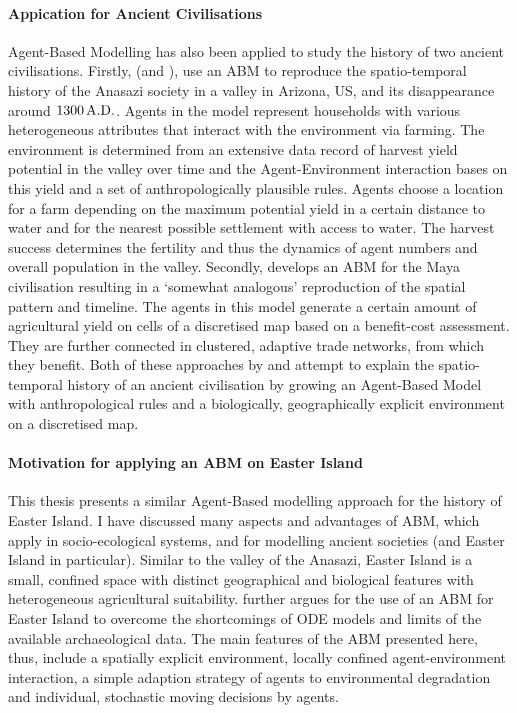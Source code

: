 \paragraph{Appication for Ancient Civilisations}
Agent-Based Modelling has also been applied to study the history of two ancient civilisations.
Firstly, \citet{Axtell2002} (and \citet{Janssen2009}), use an ABM to reproduce the spatio-temporal history of the Anasazi society in a valley in Arizona, US, and its disappearance around $1300\, {\rm A.D.}$. 
Agents in the model represent households with various heterogeneous attributes that interact with the environment via farming. 
The environment is determined from an extensive data record of harvest yield potential in the valley over time and the Agent-Environment interaction bases on this yield and a set of anthropologically plausible rules.
Agents choose a location for a farm depending on the maximum potential yield in a certain distance to water and for the nearest possible settlement with access to water. The harvest success determines the fertility and thus the dynamics of agent numbers and overall population in the valley.
Secondly, \citet{Heckbert2013} develops an ABM for the Maya civilisation resulting in a `somewhat analogous' reproduction of the spatial pattern and timeline.
The agents in this model generate a certain amount of agricultural yield on cells of a discretised map based on a benefit-cost assessment. 
They are further connected in clustered, adaptive trade networks, from which they benefit.
Both of these approaches by \citet{Axtell2002} and \citet{Heckbert2013} attempt to explain the spatio-temporal history of an ancient civilisation by growing an Agent-Based Model with anthropological rules and a biologically, geographically explicit environment on a discretised map.


\paragraph{Motivation for applying an ABM on Easter Island}
This thesis presents a similar Agent-Based modelling approach for the history of Easter Island.
I have discussed many aspects and advantages of ABM, which apply in socio-ecological systems, and for modelling ancient societies (and Easter Island in particular).
Similar to the valley of the Anasazi, Easter Island is a small, confined space with distinct geographical and biological features with heterogeneous agricultural suitability.
\citet{Merico2017} further argues for the use of an ABM for Easter Island to overcome the shortcomings of ODE models and limits of the available archaeological data.
The main features of the ABM presented here, thus, include a spatially explicit environment, locally confined agent-environment interaction, a simple adaption strategy of agents to environmental degradation and individual, stochastic moving decisions by agents.

